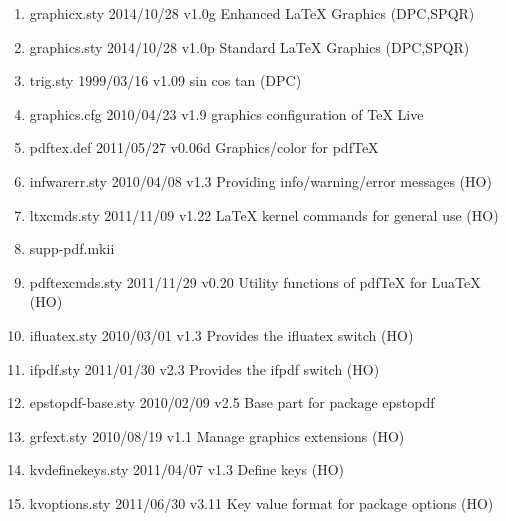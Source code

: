 \begin{enumerate}
\item graphicx.sty 2014/10/28 v1.0g Enhanced LaTeX Graphics (DPC,SPQR)
\item graphics.sty 2014/10/28 v1.0p Standard LaTeX Graphics (DPC,SPQR)
\item trig.sty 1999/03/16 v1.09 sin cos tan (DPC)
\item graphics.cfg 2010/04/23 v1.9 graphics configuration of TeX Live
\item pdftex.def 2011/05/27 v0.06d Graphics/color for pdfTeX
\item infwarerr.sty 2010/04/08 v1.3 Providing info/warning/error messages (HO)
\item ltxcmds.sty 2011/11/09 v1.22 LaTeX kernel commands for general use (HO)
\item supp-pdf.mkii
\item pdftexcmds.sty 2011/11/29 v0.20 Utility functions of pdfTeX for LuaTeX (HO)
\item ifluatex.sty 2010/03/01 v1.3 Provides the ifluatex switch (HO)
\item ifpdf.sty 2011/01/30 v2.3 Provides the ifpdf switch (HO)
\item epstopdf-base.sty 2010/02/09 v2.5 Base part for package epstopdf
\item grfext.sty 2010/08/19 v1.1 Manage graphics extensions (HO)
\item kvdefinekeys.sty 2011/04/07 v1.3 Define keys (HO)
\item kvoptions.sty 2011/06/30 v3.11 Key value format for package options (HO)

\end{enumerate}
